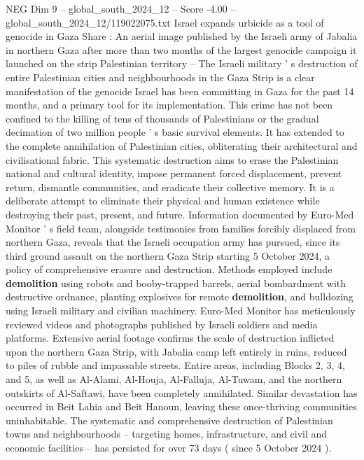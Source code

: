 \begin{textsample}{NEG Dim 9 – global\_south\_2024\_12 – Score -4.00 – global\_south\_2024\_12/119022075.txt}  \label{ex:f9_neg_126}
Israel expands urbicide as a tool of genocide in Gaza Share : An aerial image published by the Israeli army of Jabalia in northern Gaza after more than two months of the largest genocide campaign it launched on the strip Palestinian territory -- The Israeli military ' s destruction of entire Palestinian cities and neighbourhoods in the Gaza Strip is a clear manifestation of the genocide Israel has been committing in Gaza for the past 14 months, and a primary tool for its implementation.
This crime has not been confined to the killing of tens of thousands of Palestinians or the gradual decimation of two million people ' s basic survival elements.
It has extended to the complete annihilation of Palestinian cities, obliterating their architectural and civilisational fabric.
This systematic destruction aims to erase the Palestinian national and cultural identity, impose permanent forced displacement, prevent return, dismantle communities, and eradicate their collective memory.
It is a deliberate attempt to eliminate their physical and human existence while destroying their past, present, and future.
Information documented by Euro-Med Monitor ' s field team, alongside testimonies from families forcibly displaced from northern Gaza, reveals that the Israeli occupation army has pursued, since its third ground assault on the northern Gaza Strip starting 5 October 2024, a policy of comprehensive erasure and destruction.
Methods employed include \textbf{demolition} using robots and booby-trapped barrels, aerial bombardment with destructive ordnance, planting explosives for remote \textbf{demolition}, and bulldozing using Israeli military and civilian machinery.
Euro-Med Monitor has meticulously reviewed videos and photographs published by Israeli soldiers and media platforms.
Extensive aerial footage confirms the scale of destruction inflicted upon the northern Gaza Strip, with Jabalia camp left entirely in ruins, reduced to piles of rubble and impassable streets.
Entire areas, including Blocks 2, 3, 4, and 5, as well as Al-Alami, Al-Houja, Al-Falluja, Al-Tuwam, and the northern outskirts of Al-Saftawi, have been completely annihilated.
Similar devastation has occurred in Beit Lahia and Beit Hanoun, leaving these once-thriving communities uninhabitable.
The systematic and comprehensive destruction of Palestinian towns and neighbourhoods -- targeting homes, infrastructure, and civil and economic facilities -- has persisted for over 73 days ( since 5 October 2024 ).

\end{textsample}
